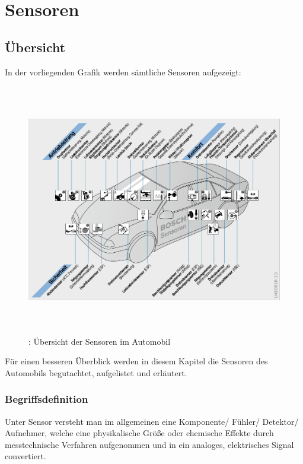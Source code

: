 \graphicspath{{./Images/Kapitel5/}}
	\section{Sensoren}
		\subsection{Übersicht} 
		
		In der vorliegenden Grafik werden s\"amtliche Sensoren aufgezeigt:
			\begin{figure}
				\centering
				\includegraphics[width=15cm, height=11cm] {sensor_uebersicht.png}
				\caption{\cite{TS01}: Übersicht der Sensoren im Automobil}	
			\end{figure}
			
			\begin{flushleft}	
			
			Für einen besseren Überblick werden in diesem Kapitel die Sensoren des Automobils begutachtet, aufgelistet und erläutert.	
			
			\end{flushleft}	
			
				\subsubsection{Begriffsdefinition}
					
					Unter Sensor versteht man im allgemeinen eine Komponente/ Fühler/ Detektor/ Aufnehmer, welche eine physikalische Größe oder chemische Effekte durch messtechnische Verfahren aufgenommen und in ein analoges, elektrisches Signal convertiert.

